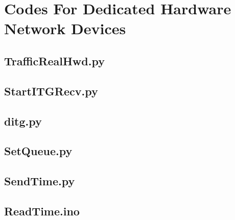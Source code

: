 \documentclass[12pt, a4paper, twoside, openright]{ociamthesis}  %
\begin{document}
\lstset{firstnumber=2}
\chapter{Codes For Dedicated Hardware Network Devices}\label{Py_codes_RNT}
\section{Traffic\textunderscore Real\textunderscore Hwd.py}\label{Traffic_Real_Hwd}

\section{Start\textunderscore ITGRecv.py}\label{Start_ITGRecv}

\section{ditg.py}\label{ditg_RLNT}

\section{Set\textunderscore Queue.py}\label{Set_Queue}

\section{SendTime.py}\label{SendTime}

\section{ReadTime.ino}\label{ReadTime}

\end{document}

